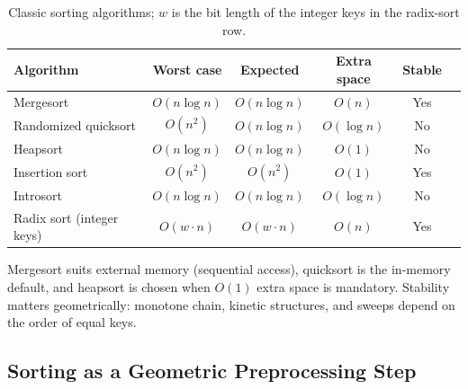 \begin{table}[htbp]
\centering
\begin{tabular}{lccccl}
\toprule
Algorithm & Worst case & Expected & Extra space & Stable \\
\midrule
Mergesort       & $O(n\log n)$ & $O(n\log n)$ & $O(n)$        & Yes \\
Randomized quicksort & $O(n^2)$ & $O(n\log n)$ & $O(\log n)$ & No \\
Heapsort        & $O(n\log n)$ & $O(n\log n)$ & $O(1)$        & No \\
Insertion sort  & $O(n^2)$ & $O(n^2)$ & $O(1)$        & Yes \\
Introsort       & $O(n\log n)$ & $O(n\log n)$ & $O(\log n)$ & No \\
Radix sort (integer keys) & $O(w\cdot n)$ & $O(w\cdot n)$ & $O(n)$ & Yes \\
\bottomrule
\end{tabular}
\caption{Classic sorting algorithms; $w$ is the bit length of the integer
keys in the radix-sort row.}
\label{tbl:appalgs_sorting}
\end{table}

Mergesort suits external memory (sequential access), quicksort is the
in-memory default, and heapsort is chosen when $O(1)$ extra space is
mandatory. Stability matters geometrically: monotone chain, kinetic
structures, and sweeps depend on the order of equal keys.

\subsection{Sorting as a Geometric Preprocessing Step}
\label{sec:appalgs_sorting_geometric}

